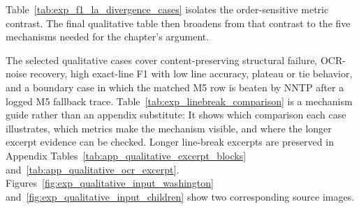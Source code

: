 Table~\ref{tab:exp_f1_la_divergence_cases} isolates the order-sensitive metric contrast. The final qualitative table then broadens from that contrast to the five mechanisms needed for the chapter's argument.

The selected qualitative cases cover content-preserving structural failure, OCR-noise recovery, high exact-line F1 with low line accuracy, plateau or tie behavior, and a boundary case in which the matched M5 row is beaten by NNTP after a logged M5 fallback trace. Table~\ref{tab:exp_linebreak_comparison} is a mechanism guide rather than an appendix substitute: It shows which comparison each case illustrates, which metrics make the mechanism visible, and where the longer excerpt evidence can be checked. Longer line-break excerpts are preserved in Appendix Tables~\ref{tab:app_qualitative_excerpt_blocks} and~\ref{tab:app_qualitative_ocr_excerpt}. Figures~\ref{fig:exp_qualitative_input_washington} and~\ref{fig:exp_qualitative_input_children} show two corresponding source images.

